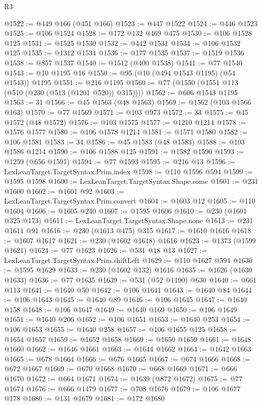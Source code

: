 \begin{lexlean}{R3}
\begin{coremodule}
@1522 := @449 @166 (@451 @166)
@1523 := @447 @1522
@1524 := @446 @1523
@1525 := @106 @1524
@1528 := @172 @132 @469 @475
@1530 := @106 @1528 @125
@1531 := @1525 @1530
@1532 := @442 @1531
@1534 := @106 @1532 @125
@1535 := @1312 @1534
@1536 := @177 @1535
@1537 := @1519 @1536
@1538 := @857 @1537
@1540 := @1512 (@400 @1538)
@1541 := @77 @1540
@1543 := @10 @1195 @16
@1550 := @95 (@10 (@494 @1543 @1195) (@54 @1543)) @1195
@1551 := @216 @1195
@1560 := @77 (@1550 (@1551 @113 (@510 (@230 (@513 (@1201 @520)) @315))))
@1562 := @606 @1543 @1195
@1563 := 31
@1566 := @45 @1563 (@48 @1563)
@1569 := @1562 (@103 @1566 @163)
@1570 := @77 @1569
@1571 := @103 @973
@1572 := 33
@1575 := @45 @1572 (@48 @1572)
@1576 := @103 @1575
@1577 := @1210 @1214
@1578 := @1576 @1577
@1580 := @106 @1578 @1214
@1581 := @1571 @1580
@1582 := @106 @1581
@1583 := 34
@1586 := @45 @1583 (@48 @1583)
@1588 := @103 @1586 @1214
@1590 := @106 @1588 @125
@1591 := @1582 @1590
@1593 := @1259 (@656 @1591)
@1594 := @77 @1593
@1595 := @216 @13
@1596 := LexLeanTarget.TargetSyntax.Prim.index
@1598 := @110 @1596 @594
@1599 := @1595 @1598
@1600 := LexLeanTarget.TargetSyntax.Shape.some
@1601 := @231 @1600
@1602 := @1601 @92
@1603 := LexLeanTarget.TargetSyntax.Prim.convert
@1604 := @1603 @12
@1605 := @110 @1604
@1606 := @1605 @240
@1607 := @1595 @1606
@1610 := @230 (@1601 @325 @173)
@1611 := LexLeanTarget.TargetSyntax.Shape.none
@1613 := @231 @1611 @91
@1616 := @230 (@1613 @475) @315
@1617 := @1610 @1616
@1618 := @1607 @1617
@1621 := @230 (@1602 @1618) @1616
@1623 := @1373 (@1599 @1621)
@1624 := @77 @1623
@1626 := @531 @18 @13
@1627 := LexLeanTarget.TargetSyntax.Prim.shiftLeft
@1629 := @110 @1627 @594
@1630 := @1595 @1629
@1633 := @230 (@1602 @132) @1616
@1635 := @1626 (@1630 @1633)
@1636 := @77 @1635
@1639 := @531 (@52 @1190) @630
@1640 := @661 @113
@1641 := @1640 @50
@1642 := @106 @1641
@1643 := @1640 @84
@1644 := @106 @1643
@1645 := @1640 @89
@1646 := @106 @1645
@1647 := @1640 @158
@1648 := @106 @1647
@1649 := @1640 @169
@1650 := @106 @1649
@1651 := @1640 @206
@1652 := @106 @1651
@1653 := @1640 @253
@1654 := @106 @1653
@1655 := @1640 @258
@1657 := @106 @1655 @125
@1658 := @1654 @1657
@1659 := @1652 @1658
@1660 := @1650 @1659
@1661 := @1648 @1660
@1662 := @1646 @1661
@1663 := @1644 @1662
@1664 := @1642 @1663
@1665 := @678 @1664
@1666 := @676 @1665
@1667 := @674 @1666
@1668 := @672 @1667
@1669 := @670 @1668
@1670 := @668 @1669
@1671 := @666 @1670
@1672 := @664 @1671
@1674 := @1639 (@872 @1672)
@1675 := @77 @1674
@1676 := @666 @1479
@1677 := @708 @1676
@1679 := @106 @1677 @178
@1680 := @131 @1679
@1681 := @172 @1680

\end{coremodule}
\end{lexlean}
